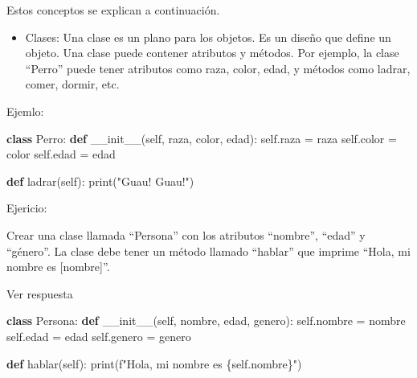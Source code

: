 \documentclass[
  a4paper,
  DIV=11,
  numbers=noendperiod,
  onepage,
  openany]{scrreprt}
\newenvironment{Shaded}{\begin{snugshade}}{\end{snugshade}}
\newcommand{\BuiltInTok}[1]{\textcolor[rgb]{0.00,0.23,0.31}{#1}}
\newcommand{\FunctionTok}[1]{\textcolor[rgb]{0.28,0.35,0.67}{#1}}
\newcommand{\KeywordTok}[1]{\textcolor[rgb]{0.00,0.23,0.31}{\textbf{#1}}}
\newcommand{\NormalTok}[1]{\textcolor[rgb]{0.00,0.23,0.31}{#1}}
\newcommand{\OperatorTok}[1]{\textcolor[rgb]{0.37,0.37,0.37}{#1}}
\newcommand{\SpecialCharTok}[1]{\textcolor[rgb]{0.37,0.37,0.37}{#1}}
\newcommand{\SpecialStringTok}[1]{\textcolor[rgb]{0.13,0.47,0.30}{#1}}
\newcommand{\StringTok}[1]{\textcolor[rgb]{0.13,0.47,0.30}{#1}}
\newcommand{\VariableTok}[1]{\textcolor[rgb]{0.07,0.07,0.07}{#1}}
\providecommand{\tightlist}{%
  \setlength{\itemsep}{0pt}\setlength{\parskip}{0pt}}\usepackage{longtable,booktabs,array}
\begin{document}
\begin{tcolorbox}
Estos conceptos se explican a continuación.

\begin{itemize}
\tightlist
\item
  Clases: Una clase es un plano para los objetos. Es un diseño que
  define un objeto. Una clase puede contener atributos y métodos. Por
  ejemplo, la clase ``Perro'' puede tener atributos como raza, color,
  edad, y métodos como ladrar, comer, dormir, etc.
\end{itemize}

Ejemlo:

\begin{Shaded}
\begin{Highlighting}[]
\KeywordTok{class}\NormalTok{ Perro:}
    \KeywordTok{def} \FunctionTok{\_\_init\_\_}\NormalTok{(}\VariableTok{self}\NormalTok{, raza, color, edad):}
        \VariableTok{self}\NormalTok{.raza }\OperatorTok{=}\NormalTok{ raza}
        \VariableTok{self}\NormalTok{.color }\OperatorTok{=}\NormalTok{ color}
        \VariableTok{self}\NormalTok{.edad }\OperatorTok{=}\NormalTok{ edad}

    \KeywordTok{def}\NormalTok{ ladrar(}\VariableTok{self}\NormalTok{):}
        \BuiltInTok{print}\NormalTok{(}\StringTok{"Guau! Guau!"}\NormalTok{)}
\end{Highlighting}
\end{Shaded}

Ejericio:

Crear una clase llamada ``Persona'' con los atributos ``nombre'',
``edad'' y ``género''. La clase debe tener un método llamado ``hablar''
que imprime ``Hola, mi nombre es {[}nombre{]}''.

Ver respuesta

\begin{Shaded}
\begin{Highlighting}[]
\KeywordTok{class}\NormalTok{ Persona:}
    \KeywordTok{def} \FunctionTok{\_\_init\_\_}\NormalTok{(}\VariableTok{self}\NormalTok{, nombre, edad, genero):}
        \VariableTok{self}\NormalTok{.nombre }\OperatorTok{=}\NormalTok{ nombre}
        \VariableTok{self}\NormalTok{.edad }\OperatorTok{=}\NormalTok{ edad}
        \VariableTok{self}\NormalTok{.genero }\OperatorTok{=}\NormalTok{ genero}

    \KeywordTok{def}\NormalTok{ hablar(}\VariableTok{self}\NormalTok{):}
        \BuiltInTok{print}\NormalTok{(}\SpecialStringTok{f"Hola, mi nombre es }\SpecialCharTok{\{}\VariableTok{self}\SpecialCharTok{.}\NormalTok{nombre}\SpecialCharTok{\}}\SpecialStringTok{"}\NormalTok{)}
\end{Highlighting}
\end{Shaded}


\end{tcolorbox}
\end{document}
